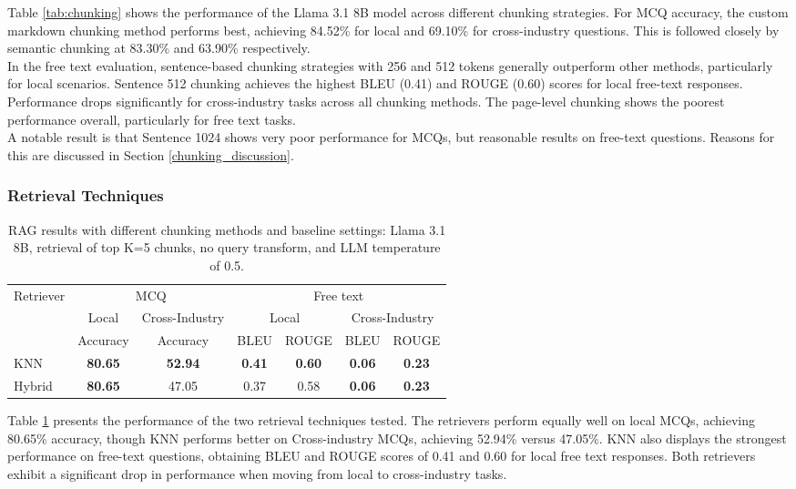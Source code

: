 Table \ref{tab:chunking} shows the performance of the Llama 3.1 8B model across different chunking strategies. For MCQ accuracy, the custom markdown chunking method performs best, achieving 84.52\% for local and 69.10\% for cross-industry questions. This is followed closely by semantic chunking at 83.30\% and 63.90\% respectively.\\

In the free text evaluation, sentence-based chunking strategies with 256 and 512 tokens generally outperform other methods, particularly for local scenarios. Sentence 512 chunking achieves the highest BLEU (0.41) and ROUGE (0.60) scores for local free-text responses. Performance drops significantly for cross-industry tasks across all chunking methods. The page-level chunking shows the poorest performance overall, particularly for free text tasks. \\

A notable result is that Sentence 1024 shows very poor performance for MCQs, but reasonable results on free-text questions. Reasons for this are discussed in Section \ref{chunking_discussion}. 


 

\subsubsection{Retrieval Techniques}
\begin{table}[H]
\centering
\begin{tabular}{lcccccc}
\hline
\multirow{3}{*}{Retriever} & \multicolumn{2}{c}{MCQ} & \multicolumn{4}{c}{Free text} \\ \cline{2-7} 
 & Local & Cross-Industry & \multicolumn{2}{c}{Local} & \multicolumn{2}{c}{Cross-Industry} \\  
 & Accuracy & Accuracy & BLEU & ROUGE & BLEU & ROUGE \\ \hline
KNN     & \textbf{80.65} & \textbf{52.94} & \textbf{0.41} & \textbf{0.60} & \textbf{0.06} & \textbf{0.23} \\
Hybrid            & \textbf{80.65} & 47.05 & 0.37 & 0.58 & \textbf{0.06} & \textbf{0.23} \\ \hline
\end{tabular}
\caption{RAG results with different chunking methods and baseline settings: Llama 3.1 8B, retrieval of top K=5 chunks, no query transform, and LLM temperature of 0.5.}
\label{tab:retriever-comparison}
\end{table}


Table \ref{tab:retriever-comparison} presents the performance of the two retrieval techniques tested. The retrievers perform equally well on local MCQs, achieving 80.65\% accuracy, though KNN performs better on Cross-industry MCQs, achieving 52.94\% versus 47.05\%. KNN also displays the strongest performance on free-text questions, obtaining BLEU and ROUGE scores of 0.41 and 0.60 for local free text responses. Both retrievers exhibit a significant drop in performance when moving from local to cross-industry tasks. 


